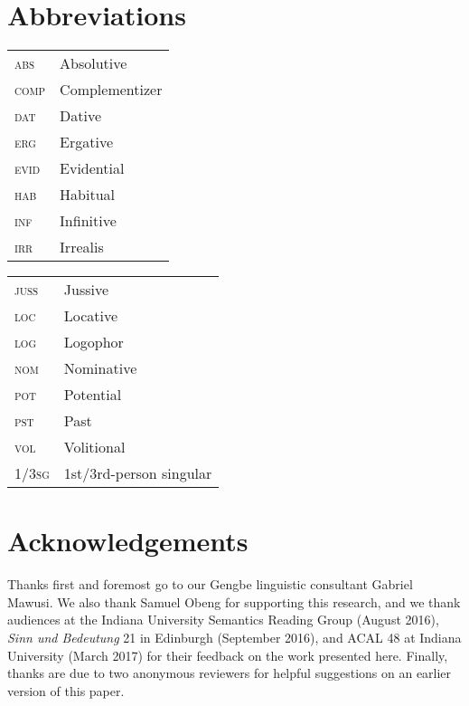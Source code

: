 \documentclass[output=paper,modfonts,nonflat]{langsci/langscibook}
\begin{document}
\section*{Abbreviations}


\noindent\begin{tabularx}{.5\textwidth}{@{}ll@{}}
    \textsc{abs} & Absolutive\\
    \textsc{comp} & Complementizer\\
    \textsc{dat} & Dative\\
    \textsc{erg} & Ergative\\
    \textsc{evid} & Evidential\\
    \textsc{hab} & Habitual\\
    \textsc{inf} & Infinitive\\
    \textsc{irr} & Irrealis\\
\end{tabularx}%
\begin{tabularx}{.5\textwidth}{@{}l l@{}}
    \textsc{juss} & Jussive\\
    \textsc{loc} & Locative\\
    \textsc{log} & Logophor\\
    \textsc{nom} & Nominative\\
    \textsc{pot} & Potential\\
    \textsc{pst} & Past\\
    \textsc{vol} & Volitional\\
    1/3\textsc{sg} & 1st/3rd-person singular\\
\end{tabularx}

 
\section*{Acknowledgements}\largerpage
Thanks first and foremost go to our Gengbe linguistic consultant Gabriel Mawusi. We also thank Samuel Obeng for supporting this research, and we thank audiences at the Indiana University Semantics Reading Group (August 2016), \emph{Sinn und Bedeutung} 21 in Edinburgh (September 2016), and ACAL 48 at Indiana University (March 2017) for their feedback on the work presented here. Finally, thanks are due to two anonymous reviewers for helpful suggestions on an earlier version of this paper.

{\sloppy\printbibliography[heading=subbibliography,notkeyword=this]}
\end{document}
